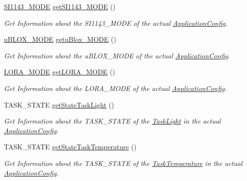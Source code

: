 \begin{DoxyCompactItemize}
\hyperlink{_s_i1143_config_8h_ae6d915c2410b566eab9cc10516661ecd}{S\+I1143\+\_\+\+M\+O\+D\+E} \hyperlink{class_application_config_ac6cf1ab1efc57d39c93115eef1ff143e}{get\+S\+I1143\+\_\+\+M\+O\+D\+E} ()
\begin{DoxyCompactList}\small\item\em Get Information about the S\+I1143\+\_\+\+M\+O\+D\+E of the actual \hyperlink{class_application_config}{Application\+Config}. \end{DoxyCompactList}\item 
\hyperlink{u_blox_config_8h_a6385c8c7bdf45fd188525597db9b7314}{u\+B\+L\+O\+X\+\_\+\+M\+O\+D\+E} \hyperlink{class_application_config_a00a1e2b271701b68f6f093e6cd8c1a1b}{getu\+Blox\+\_\+\+M\+O\+D\+E} ()
\begin{DoxyCompactList}\small\item\em Get Information about the u\+B\+L\+O\+X\+\_\+\+M\+O\+D\+E of the actual \hyperlink{class_application_config}{Application\+Config}. \end{DoxyCompactList}\item 
\hyperlink{_lo_ra_config_8h_a07be112bb46983585d462a9039dc470c}{L\+O\+R\+A\+\_\+\+M\+O\+D\+E} \hyperlink{class_application_config_ad133cc72d76151e0e4c0283db5b124fd}{get\+L\+O\+R\+A\+\_\+\+M\+O\+D\+E} ()
\begin{DoxyCompactList}\small\item\em Get Information about the L\+O\+R\+A\+\_\+\+M\+O\+D\+E of the actual \hyperlink{class_application_config}{Application\+Config}. \end{DoxyCompactList}\item 
T\+A\+S\+K\+\_\+\+S\+T\+A\+T\+E \hyperlink{class_application_config_a9baec0b53f700669b74526d83e18819e}{get\+State\+Task\+Light} ()
\begin{DoxyCompactList}\small\item\em Get Information about the T\+A\+S\+K\+\_\+\+S\+T\+A\+T\+E of the \hyperlink{class_task_light}{Task\+Light} in the actual \hyperlink{class_application_config}{Application\+Config}. \end{DoxyCompactList}\item 
T\+A\+S\+K\+\_\+\+S\+T\+A\+T\+E \hyperlink{class_application_config_a029ef84409035c71e0f61e003c5458f0}{get\+State\+Task\+Temperature} ()
\begin{DoxyCompactList}\small\item\em Get Information about the T\+A\+S\+K\+\_\+\+S\+T\+A\+T\+E of the \hyperlink{class_task_temperature}{Task\+Temperature} in the actual \hyperlink{class_application_config}{Application\+Config}. \end{DoxyCompactList}\item 

\end{DoxyCompactItemize}
